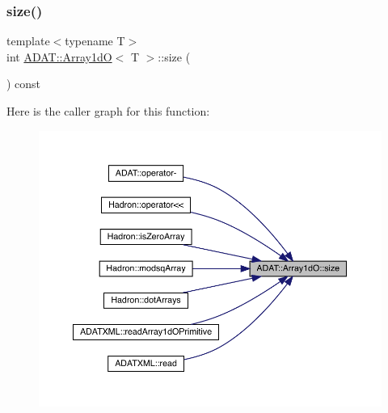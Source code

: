 \mbox{\label{classADAT_1_1Array1dO_a749307d8e42867d6fac39dc9aca84978}} 
\subsubsection{\texorpdfstring{size()}{size()}\hspace{0.1cm}{\footnotesize\ttfamily [2/3]}}
{\footnotesize\ttfamily template$<$typename T$>$ \\
int \mbox{\hyperlink{classADAT_1_1Array1dO}{A\+D\+A\+T\+::\+Array1dO}}$<$ T $>$\+::size (\begin{DoxyParamCaption}{ }\end{DoxyParamCaption}) const\hspace{0.3cm}{\ttfamily [inline]}}

Here is the caller graph for this function\+:
\nopagebreak
\begin{figure}[H]
\begin{center}
\leavevmode
\includegraphics[width=350pt]{db/d5c/classADAT_1_1Array1dO_a749307d8e42867d6fac39dc9aca84978_icgraph}
\end{center}
\end{figure}
\mbox{\label{classADAT_1_1Array1dO_a749307d8e42867d6fac39dc9aca84978}} 
